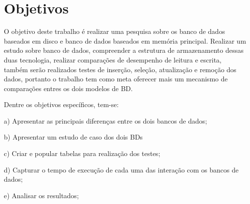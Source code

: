 
\section{Objetivos}
\label{secao1}

O objetivo deste trabalho é realizar uma pesquisa sobre os banco de dados baseados em disco e banco de dados baseados em memória principal. Realizar um estudo sobre banco de dados, compreender a estrutura de armazenamento dessas duas tecnologia, realizar comparações de desempenho de leitura e escrita, também serão realizados testes de inserção, seleção, atualização e remoção dos dados, portanto o trabalho tem como meta oferecer mais um mecanismo de comparações entres os dois modelos de \ac{BD}.  



Dentre os objetivos específicos, tem-se:

	\begin{compactitem}
      \item[a)] Apresentar as principais diferenças entre os dois bancos de dados;
      \item[b)] Apresentar um estudo de caso dos dois BDs
      \item[c)] Criar e popular tabelas para realização dos testes;
      \item[d)] Capturar o tempo de execução de cada uma das interação com os bancos de dados;
      \item[e)] Analisar os resultados;
    \end{compactitem}

